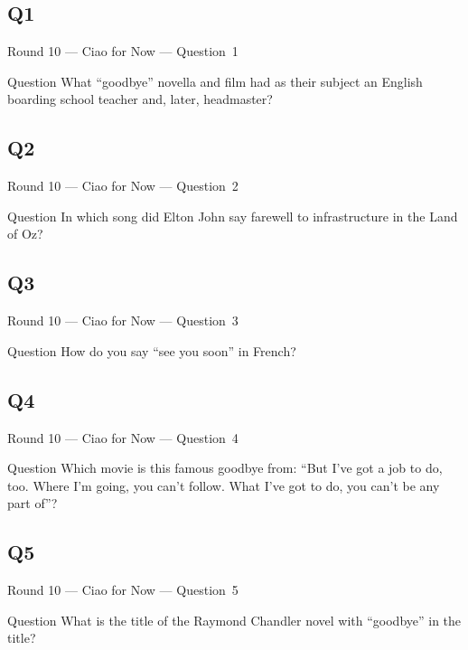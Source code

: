 \documentclass[11pt]{beamer}
\begin{document}
\subsection*{Q1}
\begin{frame}[t]{Round 10 --- Ciao for Now --- \mbox{Question 1}}
\vspace{-0.5em}
\begin{block}{Question}
What ``goodbye'' novella and film had as their subject an English boarding school teacher and, later, headmaster?
\end{block}
\end{frame}
\subsection*{Q2}
\begin{frame}[t]{Round 10 --- Ciao for Now --- \mbox{Question 2}}
\vspace{-0.5em}
\begin{block}{Question}
In which song did Elton John say farewell to infrastructure in the Land of Oz?
\end{block}
\end{frame}
\subsection*{Q3}
\begin{frame}[t]{Round 10 --- Ciao for Now --- \mbox{Question 3}}
\vspace{-0.5em}
\begin{block}{Question}
How do you say ``see you soon'' in French?
\end{block}
\end{frame}
\subsection*{Q4}
\begin{frame}[t]{Round 10 --- Ciao for Now --- \mbox{Question 4}}
\vspace{-0.5em}
\begin{block}{Question}
Which movie is this famous goodbye from: ``But I've got a job to do, too. Where I'm going, you can't follow. What I've got to do, you can't be any part of''?
\end{block}
\end{frame}
\subsection*{Q5}
\begin{frame}[t]{Round 10 --- Ciao for Now --- \mbox{Question 5}}
\vspace{-0.5em}
\begin{block}{Question}
What is the title of the Raymond Chandler novel with ``goodbye'' in the title?
\end{block}
\end{frame}
\end{document}

